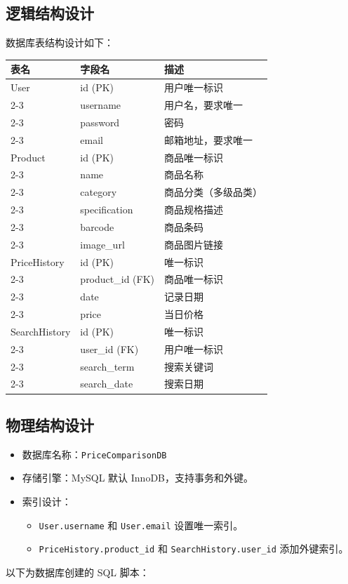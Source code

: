 \documentclass[12pt]{article}
\begin{document}
\subsection{逻辑结构设计}
数据库表结构设计如下：

\begin{longtable}{|p{3cm}|p{4cm}|p{8cm}|}
\hline
\textbf{表名} & \textbf{字段名} & \textbf{描述} \\ \hline

User & id (PK) & 用户唯一标识 \\ \cline{2-3}
& username & 用户名，要求唯一 \\ \cline{2-3}
& password & 密码 \\ \cline{2-3}
& email & 邮箱地址，要求唯一 \\ \hline

Product & id (PK) & 商品唯一标识 \\ \cline{2-3}
& name & 商品名称 \\ \cline{2-3}
& category & 商品分类（多级品类） \\ \cline{2-3}
& specification & 商品规格描述 \\ \cline{2-3}
& barcode & 商品条码 \\ \cline{2-3}
& image\_url & 商品图片链接 \\ \hline

PriceHistory & id (PK) & 唯一标识 \\ \cline{2-3}
& product\_id (FK) & 商品唯一标识 \\ \cline{2-3}
& date & 记录日期 \\ \cline{2-3}
& price & 当日价格 \\ \hline

SearchHistory & id (PK) & 唯一标识 \\ \cline{2-3}
& user\_id (FK) & 用户唯一标识 \\ \cline{2-3}
& search\_term & 搜索关键词 \\ \cline{2-3}
& search\_date & 搜索日期 \\ \hline

\end{longtable}

\subsection{物理结构设计}
\begin{itemize}
    \item 数据库名称：\texttt{PriceComparisonDB}
    \item 存储引擎：MySQL 默认 InnoDB，支持事务和外键。
    \item 索引设计：
    \begin{itemize}
        \item \texttt{User.username} 和 \texttt{User.email} 设置唯一索引。
        \item \texttt{PriceHistory.product\_id} 和 \texttt{SearchHistory.user\_id} 添加外键索引。
    \end{itemize}
\end{itemize}
以下为数据库创建的 SQL 脚本：
\end{document}
